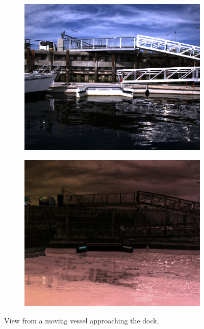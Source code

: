 \begin{figure}[H]
    \begin{subfigure}[T]{.49\textwidth}
        \includegraphics[width=\textwidth]{figures/pictures/img_11640_s0.jpg}
    \end{subfigure} \hfill
    \begin{subfigure}[T]{.49\textwidth}
        \includegraphics[width=\textwidth]{figures/pictures/img_11640_pol.jpg}
    \end{subfigure}
    \caption{View from a moving vessel approaching the dock.}
\end{figure}
\vspace{-.5cm}

